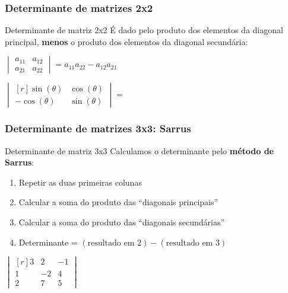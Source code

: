 \documentclass[pdftex, brazil, aspectratio=169]{beamer}
\begin{document}
\begin{frame}[t]
  \frametitle{Determinante de matrizes 2x2}
  \begin{block}{Determinante de matriz 2x2}
    É dado pelo produto dos elementos da diagonal principal, \textbf{menos} o
    produto dos elementos da diagonal secundária:
    \begin{center}
    $\begin{vmatrix}
      a_{11} & a_{12}\\
      a_{21} & a_{22}\end{vmatrix} = a_{11}a_{22} - a_{12}a_{21}$
    \end{center}
  \end{block}
  $\begin{vmatrix*}[r]
    \sin{(\theta)} & \cos{(\theta)}\\
    -\cos{(\theta)} & \sin{(\theta)}\end{vmatrix*} =$
\end{frame}

\begin{frame}[t]
  \frametitle{Determinante de matrizes 3x3: Sarrus}
  \begin{block}{Determinante de matriz 3x3}
    Calculamos o determinante pelo \textbf{método de Sarrus}:
    \begin{enumerate}
      \item Repetir as duas primeiras colunas
      \item Calcular a soma do produto das ``diagonais principais''
      \item Calcular a soma do produto das ``diagonais secundárias''
      \item Determinante = $(\text{resultado em } 2) - (\text{resultado em } 3)$
    \end{enumerate}
  \end{block}
  $\begin{vmatrix*}[r]
    3 & 2 & -1\\
    1 & -2 & 4\\
    2 & 7 & 5\end{vmatrix*}$
\end{frame}
\end{document}
